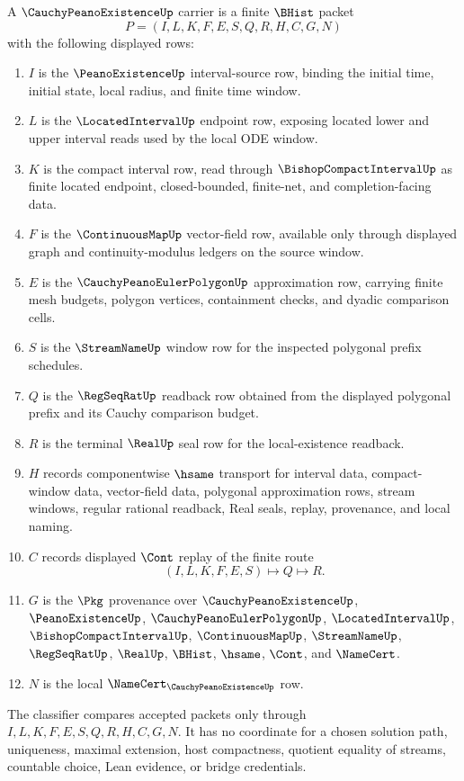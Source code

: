 \begin{definition}
\label{def:cauchy-peano-existence-carrier}
A $\CauchyPeanoExistenceUp$ carrier is a finite $\BHist$ packet
$$
P=(I,L,K,F,E,S,Q,R,H,C,G,N)
$$
with the following displayed rows:
\begin{enumerate}
\item $I$ is the $\PeanoExistenceUp$ interval-source row, binding the initial time, initial state, local radius, and finite time window.
\item $L$ is the $\LocatedIntervalUp$ endpoint row, exposing located lower and upper interval reads used by the local ODE window.
\item $K$ is the compact interval row, read through $\BishopCompactIntervalUp$ as finite located endpoint, closed-bounded, finite-net, and completion-facing data.
\item $F$ is the $\ContinuousMapUp$ vector-field row, available only through displayed graph and continuity-modulus ledgers on the source window.
\item $E$ is the $\CauchyPeanoEulerPolygonUp$ approximation row, carrying finite mesh budgets, polygon vertices, containment checks, and dyadic comparison cells.
\item $S$ is the $\StreamNameUp$ window row for the inspected polygonal prefix schedules.
\item $Q$ is the $\RegSeqRatUp$ readback row obtained from the displayed polygonal prefix and its Cauchy comparison budget.
\item $R$ is the terminal $\RealUp$ seal row for the local-existence readback.
\item $H$ records componentwise $\hsame$ transport for interval data, compact-window data, vector-field data, polygonal approximation rows, stream windows, regular rational readback, Real seals, replay, provenance, and local naming.
\item $C$ records displayed $\Cont$ replay of the finite route
$$
(I,L,K,F,E,S)\longmapsto Q\longmapsto R .
$$
\item $G$ is the $\Pkg$ provenance over $\CauchyPeanoExistenceUp$, $\PeanoExistenceUp$, $\CauchyPeanoEulerPolygonUp$, $\LocatedIntervalUp$, $\BishopCompactIntervalUp$, $\ContinuousMapUp$, $\StreamNameUp$, $\RegSeqRatUp$, $\RealUp$, $\BHist$, $\hsame$, $\Cont$, and $\NameCert$.
\item $N$ is the local $\NameCert_{\CauchyPeanoExistenceUp}$ row.
\end{enumerate}
The classifier compares accepted packets only through $I,L,K,F,E,S,Q,R,H,C,G,N$. It has no coordinate for a chosen solution path, uniqueness, maximal extension, host compactness, quotient equality of streams, countable choice, Lean evidence, or bridge credentials.
\end{definition}

